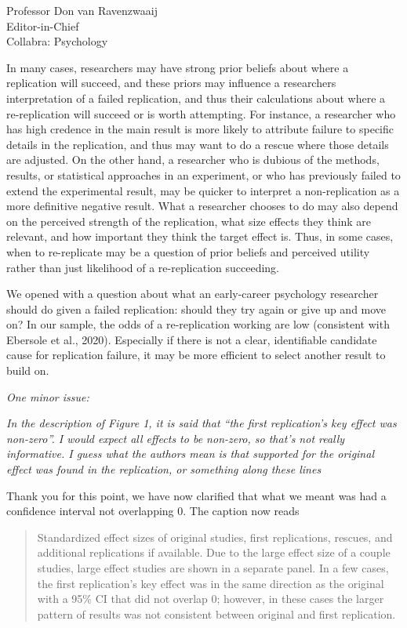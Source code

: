 \documentclass{stanfordletter}
\newcommand{\theysaid}[1]{\begin{leftbar} \noindent 
		\textsl{ #1}\end{leftbar}}
\newcommand{\revised}[1]{\begin{quote}	#1 \end{quote}}
\begin{document}
\begin{letter}{Professor Don van Ravenzwaaij \\ Editor-in-Chief \\ Collabra: Psychology }
{			In many cases, researchers may have strong prior beliefs about where a replication will succeed, and these priors may influence a researchers interpretation of a failed replication, and thus their calculations about where a re-replication will succeed or is worth attempting. For instance, a researcher who has high credence in the main result is more likely to attribute failure to specific details in the replication, and thus may want to do a rescue where those details are adjusted. On the other hand, a researcher who is dubious of the methods, results, or statistical approaches in an experiment, or who has previously failed to extend the experimental result, may be quicker to interpret a non-replication as a more definitive negative result. What a researcher chooses to do may also depend on the perceived strength of the replication, what size effects they think are relevant, and how important they think the target effect is. Thus, in some cases, when to re-replicate may be a question of prior beliefs and perceived utility rather than just likelihood of a re-replication succeeding.
			\newline
			
			We opened with a question about what an early-career psychology researcher should do given a failed replication: should they try again or give up and move on?
			In our sample, the odds of a re-replication working are low (consistent with Ebersole et al., 2020).
			Especially if there is not a clear, identifiable candidate cause for replication failure, it may be more efficient to select another result to build on.
		}

		
		\theysaid{One minor issue:}
		\theysaid{In the description of Figure 1, it is said that “the first replication’s key effect was non-zero”. I would expect all effects to be non-zero, so that’s not really informative. I guess what the authors mean is that supported for the original effect was found in the replication, or something along these lines}
		
		Thank you for this point, we have now clarified that what we meant was had a confidence interval not overlapping 0. The caption now reads
		
		\revised{Standardized effect sizes of original studies, first replications, rescues, and additional replications if available. Due to the large effect size of a couple studies, large effect studies are shown in a separate panel. In a few cases, the first replication's key effect was in the same direction as the original with a 95\% CI that did not overlap 0; however, in these cases the larger pattern of results was not consistent between original and first replication. }
		

\end{letter}
\end{document}
